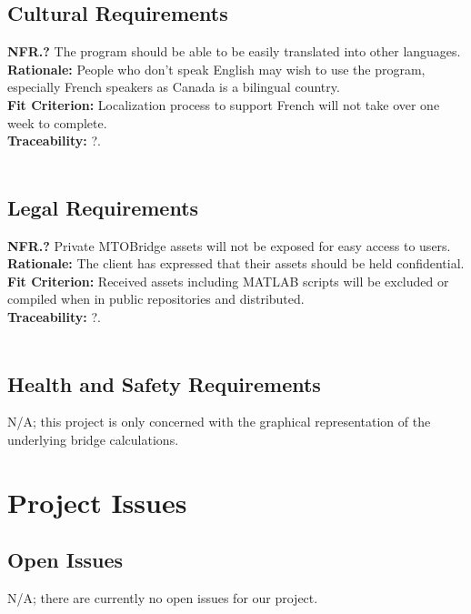 \documentclass[12pt]{article}
\begin{document}
\subsection{Cultural Requirements}

  \textbf{NFR.?} The program should be able to be easily translated into other languages.\\
  \textbf{Rationale:} People who don't speak English may wish to use the program, especially French speakers as Canada is a bilingual country.\\
  \textbf{Fit Criterion:} Localization process to support French will not take over one week to complete.\\
  \textbf{Traceability:} ?.\\\\

\subsection{Legal Requirements}

  \textbf{NFR.?} Private MTOBridge assets will not be exposed for easy access to users.\\
  \textbf{Rationale:} The client has expressed that their assets should be held confidential.\\
  \textbf{Fit Criterion:} Received assets including MATLAB scripts will be excluded or compiled when in public repositories and distributed.\\
  \textbf{Traceability:} ?.\\\\

\subsection{Health and Safety Requirements}

N/A; this project is only concerned with the graphical representation of the underlying bridge calculations.\\

\section{Project Issues}

\subsection{Open Issues}

N/A; there are currently no open issues for our project.
\end{document}
